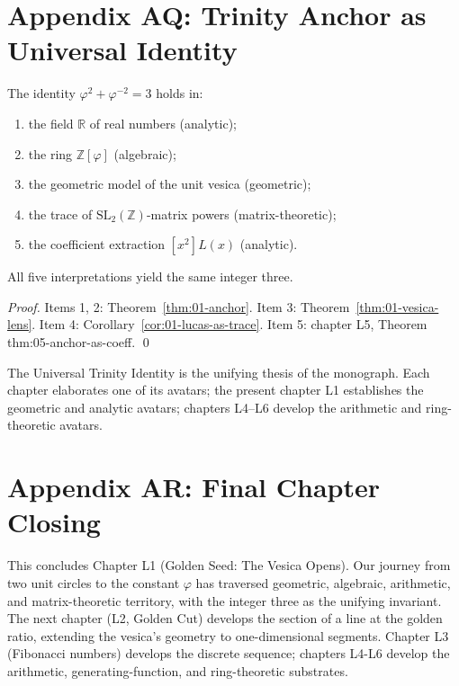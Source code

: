 \section*{Appendix AQ: Trinity Anchor as Universal Identity}
\label{sec:01-app-AQ}

\begin{theorem}
\label{thm:01-universal-anchor}
The identity $\varphi^2 + \varphi^{-2} = 3$ holds in:
\begin{enumerate}
  \item the field $\mathbb{R}$ of real numbers (analytic);
  \item the ring $\mathbb{Z}[\varphi]$ (algebraic);
  \item the geometric model of the unit vesica (geometric);
  \item the trace of $\mathrm{SL}_2(\mathbb{Z})$-matrix powers
    (matrix-theoretic);
  \item the coefficient extraction $[x^2] L(x)$ (analytic).
\end{enumerate}
All five interpretations yield the same integer three.
\end{theorem}

\begin{proof}
Items 1, 2: Theorem~\ref{thm:01-anchor}. Item 3:
Theorem~\ref{thm:01-vesica-lens}. Item 4:
Corollary~\ref{cor:01-lucas-as-trace}. Item 5: chapter L5,
Theorem thm:05-anchor-as-coeff.
\qed
\end{proof}

\begin{remark}
The Universal Trinity Identity is the unifying thesis of the
monograph. Each chapter elaborates one of its avatars; the present
chapter L1 establishes the geometric and analytic avatars; chapters
L4--L6 develop the arithmetic and ring-theoretic avatars.
\end{remark}

\section*{Appendix AR: Final Chapter Closing}
\label{sec:01-app-AR}

This concludes Chapter L1 (Golden Seed: The Vesica Opens). Our journey
from two unit circles to the constant $\varphi$ has traversed
geometric, algebraic, arithmetic, and matrix-theoretic territory,
with the integer three as the unifying invariant. The next chapter
(L2, Golden Cut) develops the section of a line at the golden ratio,
extending the vesica's geometry to one-dimensional segments. Chapter
L3 (Fibonacci numbers) develops the discrete sequence; chapters L4-L6
develop the arithmetic, generating-function, and ring-theoretic
substrates.

